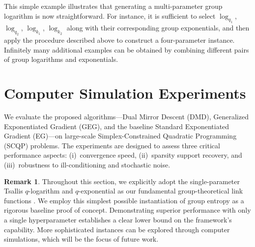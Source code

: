 \documentclass[10pt]{amsart}
\newcommand{\bi}[1]{\textbf{\textit{#1}}}
\newcommand{\blog}{\rm{\bf{log}}}
\theoremstyle{definition}
\newtheorem{remark}{\textbf{Remark}}
\theoremstyle{definition}	 %
\begin{document}
\vspace{2mm}

This simple example illustrates that generating a multi-parameter group logarithm is now straightforward. For instance, it is sufficient to select $\log_{q_1}$, $\log_{q_2}$, $\log_{k_1}$, $\log_{k_2}$ along with their corresponding group exponentials, and then apply the procedure described above to construct a four-parameter instance. Infinitely many additional examples can be obtained by combining different pairs of group logarithms and exponentials.




\section{Computer Simulation Experiments}\label{Sec5}



We evaluate the proposed algorithms---Dual Mirror Descent (DMD),
Generalized Exponentiated Gradient (GEG), and the baseline Standard
Exponentiated Gradient (EG)---on large-scale Simplex-Constrained
Quadratic Programming (SCQP) problems.  The experiments are designed to
assess three critical performance aspects: (i)~convergence speed,
(ii)~sparsity support recovery, and (iii)~robustness to
ill-conditioning and stochastic noise.

\begin{remark}
%
Throughout this section, we explicitly adopt the single-parameter Tsallis $q$-logarithm and $q$-exponential as our fundamental group-theoretical link functions%
. We employ this simplest possible instantiation of group entropy as a rigorous baseline proof of concept. Demonstrating superior performance with only a single hyperparameter establishes a clear lower bound on the framework’s capability. More sophisticated instances can be explored through computer simulations, which will be the focus of future work.


%
\end{remark}
\end{document}
